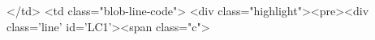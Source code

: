           </td>
          <td class="blob-line-code">
                  <div class="highlight"><pre><div class='line' id='LC1'><span class="c">%